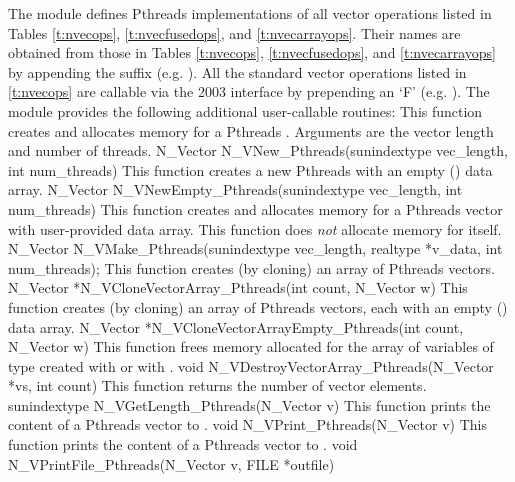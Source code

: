 The {\nvecpthreads} module defines Pthreads implementations of all vector operations listed 
in Tables \ref{t:nvecops}, \ref{t:nvecfusedops}, and \ref{t:nvecarrayops}. Their names are
obtained from those in Tables \ref{t:nvecops}, \ref{t:nvecfusedops}, and
\ref{t:nvecarrayops} by appending the suffix 
(e.g. ).
All the standard vector operations listed in \ref{t:nvecops} are callable via
the {\F} 2003 interface by prepending an `F' (e.g. ).
The module {\nvecpthreads} provides the following additional user-callable routines:
{
  This function creates and allocates memory for a Pthreads .
  Arguments are the vector length and number of threads.
}
{
  N\_Vector N\_VNew\_Pthreads(sunindextype vec\_length, int num\_threads)
}
{
  This function creates a new Pthreads  with an empty () data array.
}
{
  N\_Vector N\_VNewEmpty\_Pthreads(sunindextype vec\_length, int num\_threads)
}
{
  This function creates and allocates memory for a Pthreads vector
  with user-provided data array. This function does {\em not} allocate memory
  for  itself.
}
{
  N\_Vector N\_VMake\_Pthreads(sunindextype vec\_length, realtype *v\_data,
  int num\_threads);
}
{
  This function creates (by cloning) an array of  Pthreads vectors.
}
{
  N\_Vector *N\_VCloneVectorArray\_Pthreads(int count, N\_Vector w)
}
{
  This function creates (by cloning) an array of  Pthreads vectors, each with an
  empty () data array.
}
{
  N\_Vector *N\_VCloneVectorArrayEmpty\_Pthreads(int count, N\_Vector w)
}
{
  This function frees memory allocated for the array of  variables of type
   created with  or with
  .
}
{
  void N\_VDestroyVectorArray\_Pthreads(N\_Vector *vs, int count)
}
{
  This function returns the number of vector elements.
}
{ 
  sunindextype N\_VGetLength\_Pthreads(N\_Vector v)
}
{
  This function prints the content of a Pthreads vector to .
}
{
  void N\_VPrint\_Pthreads(N\_Vector v)
}
{
  This function prints the content of a Pthreads vector to .
}
{
  void N\_VPrintFile\_Pthreads(N\_Vector v, FILE *outfile)
}

